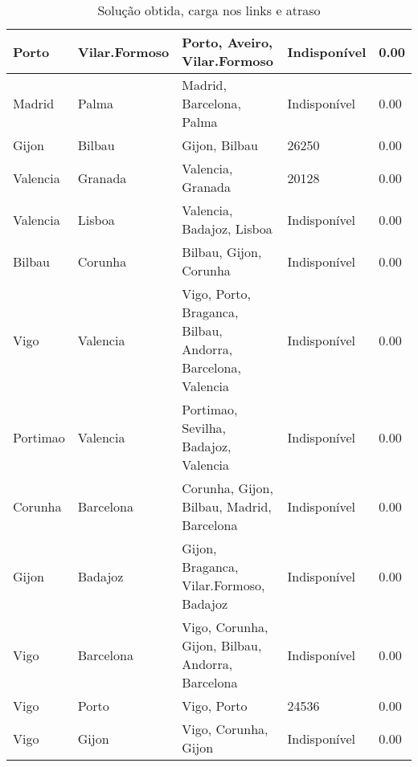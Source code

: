\begin{table}[!htb]
{\begin{tabular}{|l|l|l|l|l|}
Porto & Vilar.Formoso & Porto, Aveiro, Vilar.Formoso & Indisponível & 0.00 \\ \hline
Madrid & Palma & Madrid, Barcelona, Palma & Indisponível & 0.00 \\ \hline
Gijon & Bilbau & Gijon, Bilbau & 26250 & 0.00 \\ \hline
Valencia & Granada & Valencia, Granada & 20128 & 0.00 \\ \hline
Valencia & Lisboa & Valencia, Badajoz, Lisboa & Indisponível & 0.00 \\ \hline
Bilbau & Corunha & Bilbau, Gijon, Corunha & Indisponível & 0.00 \\ \hline
Vigo & Valencia & Vigo, Porto, Braganca, Bilbau, Andorra, Barcelona, Valencia & Indisponível & 0.00 \\ \hline
Portimao & Valencia & Portimao, Sevilha, Badajoz, Valencia & Indisponível & 0.00 \\ \hline
Corunha & Barcelona & Corunha, Gijon, Bilbau, Madrid, Barcelona & Indisponível & 0.00 \\ \hline
Gijon & Badajoz & Gijon, Braganca, Vilar.Formoso, Badajoz & Indisponível & 0.00 \\ \hline
Vigo & Barcelona & Vigo, Corunha, Gijon, Bilbau, Andorra, Barcelona & Indisponível & 0.00 \\ \hline
Vigo & Porto & Vigo, Porto & 24536 & 0.00 \\ \hline
Vigo & Gijon & Vigo, Corunha, Gijon & Indisponível & 0.00 \\ \hline
\end{tabular}}
\caption[]{Solução obtida, carga nos links e atraso}
\end{table}

